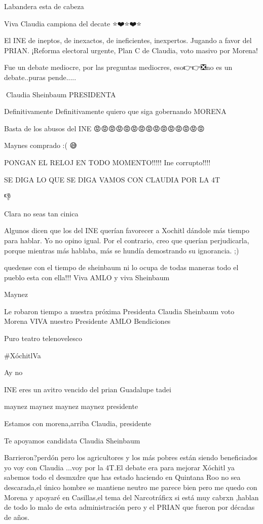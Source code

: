 Labandera esta de cabeza

Viva Claudia campiona del decate ⭐️❤️⭐️❤️⭐️

El INE de ineptos, de inexactos, de ineficientes, inexpertos. Jugando a favor del PRIAN. ¡Reforma electoral urgente, Plan C de Claudia, voto masivo por Morena!

Fue un debate mediocre, por las preguntas mediocres, eso👉👉❎️no es un debate..puras pende.....

🎉Claudia Sheinbaum PRESIDENTA

Definitivamente Definitivamente quiero que siga gobernando MORENA

Basta de los abusos del INE 😡😡😡😡😡😡😡😡😡😡😡😡😡😡😡

Maynes comprado :( 😅

PONGAN EL RELOJ EN TODO MOMENTO!!!!! Ine corrupto!!!!

SE DIGA LO QUE SE DIGA VAMOS CON CLAUDIA POR LA 4T

👎

Clara no seas tan cinica

Algunos dicen que los del INE querían favorecer a Xochitl dándole más tiempo para hablar. Yo no opino igual. Por el contrario, creo que querían perjudicarla, porque mientras más hablaba, más se hundía demostrando su ignorancia. ;)

quedense con el tiempo de sheinbaum ni lo ocupa de todas maneras todo el pueblo esta con ella!!! Viva AMLO y viva Sheinbaum

Maynez

Le robaron  tiempo  a nuestra próxima Presidenta Claudia Sheinbaum  voto  Morena VIVA nuestro Presidente AMLO Bendiciones

Puro teatro telenovelesco

#XóchitlVa

Ay no

INE eres un avitro vencido del prian Guadalupe tadei

maynez maynez maynez maynez presidente

Estamos con morena,arriba Claudia, presidente

Te apoyamos candidata Claudia Sheinbaum

Barrieron?perdón pero los agricultores y los más pobres están siendo beneficiados yo voy con Claudia ...voy por la 4T.El debate era para mejorar Xóchitl ya sabemos todo el desmxdre que has estado haciendo en Quintana Roo no sea descarada,el único hombre se mantiene neutro me parece bien pero me quedo con Morena y apoyaré en Casillas,el tema del Narcotráficx si está muy cabrxn ,hablan de todo lo malo de esta administración pero y el PRIAN que fueron por décadas de años.

